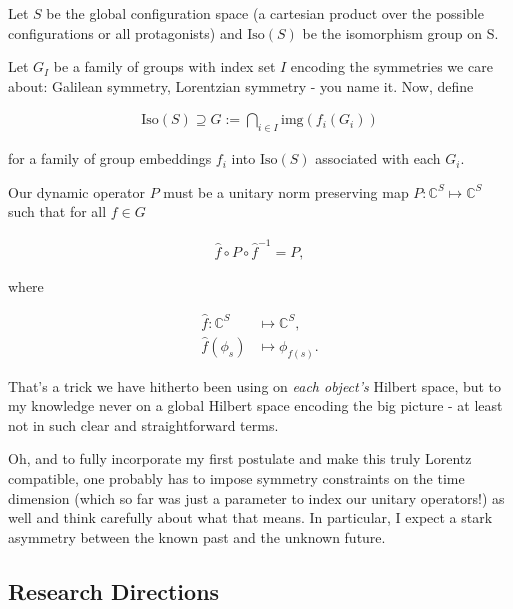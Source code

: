\documentclass{article}
\begin{document}
Let $S$ be the global configuration space (a cartesian product over the possible configurations or all protagonists) and $\mathrm{Iso}(S)$ be the isomorphism group on S.

Let $G_I$ be a family of groups with index set $I$ encoding the symmetries we care about: Galilean symmetry, Lorentzian symmetry - you name it. Now, define

\begin{align*}
\mathrm{Iso}(S) \supseteq G := \bigcap_{i\in I}\mathrm{img}(f_i(G_i))
\end{align*}

for a family of group embeddings $f_i$ into $\mathrm{Iso}(S)$ associated with each $G_i$.

Our dynamic operator $P$ must be a unitary norm preserving map $P:\mathbb{C}^S\longmapsto\mathbb{C}^S$ such that for all $f\in G$

\begin{mdframed}
\begin{align*}
\hat{f}\circ P\circ \hat{f}^{-1} = P,
\end{align*}

where

\begin{align*}
\hat{f}:\mathbb{C}^S &\longmapsto \mathbb{C}^S,\\ \hat{f}(\phi_s) &\mapsto \phi_{f(s)}.
\end{align*}
\end{mdframed}

That's a trick we have hitherto been using on \textit{each object's} Hilbert space, but to my knowledge never on a global Hilbert space encoding the big picture - at least not in such clear and straightforward terms.

Oh, and to fully incorporate my first postulate and make this truly Lorentz compatible, one probably has to impose symmetry constraints on the time dimension (which so far was just a parameter to index our unitary operators!) as well and think carefully about what that means. In particular, I expect a stark asymmetry between the known past and the unknown future.

\subsection{Research Directions}
\end{document}
